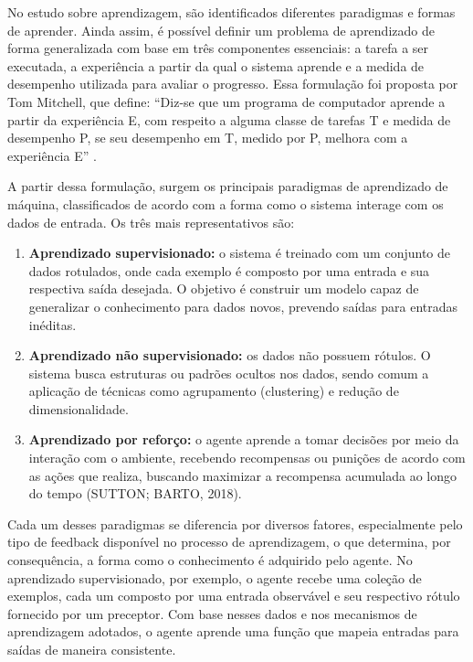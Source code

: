 No estudo sobre aprendizagem, são identificados diferentes paradigmas e formas de aprender. Ainda assim, é possível definir um problema de aprendizado de forma generalizada com base em três componentes essenciais: a tarefa a ser executada, a experiência a partir da qual o sistema aprende e a medida de desempenho utilizada para avaliar o progresso. Essa formulação foi proposta por Tom Mitchell, que define: “Diz-se que um programa de computador aprende a partir da experiência E, com respeito a alguma classe de tarefas T e medida de desempenho P, se seu desempenho em T, medido por P, melhora com a experiência E” \cite{mitchell_machine_2013}.

A partir dessa formulação, surgem os principais paradigmas de aprendizado de máquina, classificados de acordo com a forma como o sistema interage com os dados de entrada. Os três mais representativos são:

\begin{enumerate}
    \item \textbf{Aprendizado supervisionado:} o sistema é treinado com um conjunto de dados rotulados, onde cada exemplo é composto por uma entrada e sua respectiva saída desejada. O objetivo é construir um modelo capaz de generalizar o conhecimento para dados novos, prevendo saídas para entradas inéditas.

    \item \textbf{Aprendizado não supervisionado:} os dados não possuem rótulos. O sistema busca estruturas ou padrões ocultos nos dados, sendo comum a aplicação de técnicas como agrupamento (clustering) e redução de dimensionalidade.

    \item \textbf{Aprendizado por reforço:} o agente aprende a tomar decisões por meio da interação com o ambiente, recebendo recompensas ou punições de acordo com as ações que realiza, buscando maximizar a recompensa acumulada ao longo do tempo (SUTTON; BARTO, 2018).
\end{enumerate}

Cada um desses paradigmas se diferencia por diversos fatores, especialmente pelo tipo de feedback disponível no processo de aprendizagem, o que determina, por consequência, a forma como o conhecimento é adquirido pelo agente. No aprendizado supervisionado, por exemplo, o agente recebe uma coleção de exemplos, cada um composto por uma entrada observável e seu respectivo rótulo fornecido por um preceptor. Com base nesses dados e nos mecanismos de aprendizagem adotados, o agente aprende uma função que mapeia entradas para saídas de maneira consistente.

